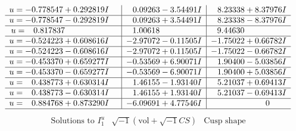 \documentclass[1p]{elsarticle_modified}
\theoremstyle{definition}
\newcommand{\I}{\sqrt{-1}}
\begin{document}
$$\begin{array}{c|c|c}
\begin{aligned}
u &= -0.778547 + 0.292819 I\end{aligned}
 & \phantom{-}0.09263 - 3.54491 I & \phantom{-}8.23338 + 8.37976 I \\ \hline\begin{aligned}
u &= -0.778547 - 0.292819 I\end{aligned}
 & \phantom{-}0.09263 + 3.54491 I & \phantom{-}8.23338 - 8.37976 I \\ \hline\begin{aligned}
u &= \phantom{-}0.817837\phantom{ +0.000000I}\end{aligned}
 & \phantom{-}1.00618\phantom{ +0.000000I} & \phantom{-}9.44630\phantom{ +0.000000I} \\ \hline\begin{aligned}
u &= -0.524223 + 0.608616 I\end{aligned}
 & -2.97072 - 0.11505 I & -1.75022 + 0.66782 I \\ \hline\begin{aligned}
u &= -0.524223 - 0.608616 I\end{aligned}
 & -2.97072 + 0.11505 I & -1.75022 - 0.66782 I \\ \hline\begin{aligned}
u &= -0.453370 + 0.659277 I\end{aligned}
 & -0.53569 + 6.90071 I & \phantom{-}1.90400 - 5.03856 I \\ \hline\begin{aligned}
u &= -0.453370 - 0.659277 I\end{aligned}
 & -0.53569 - 6.90071 I & \phantom{-}1.90400 + 5.03856 I \\ \hline\begin{aligned}
u &= \phantom{-}0.438773 + 0.630314 I\end{aligned}
 & \phantom{-}1.46155 - 1.93140 I & \phantom{-}5.21037 + 0.69413 I \\ \hline\begin{aligned}
u &= \phantom{-}0.438773 - 0.630314 I\end{aligned}
 & \phantom{-}1.46155 + 1.93140 I & \phantom{-}5.21037 - 0.69413 I \\ \hline\begin{aligned}
u &= \phantom{-}0.884768 + 0.873290 I\end{aligned}
 & -6.09691 + 4.77546 I & \phantom{-0.000000 } 0\\
 \hline 
 \end{array}$$\newpage$$\begin{array}{c|c|c}  
\text{Solutions to }I^u_{1}& \I (\text{vol} + \sqrt{-1}CS) & \text{Cusp shape}\\

\end{array}$$
\end{document}
